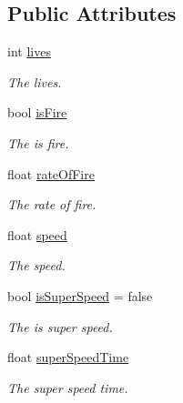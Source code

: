 \subsection*{Public Attributes}
\begin{DoxyCompactItemize}
\item 
int \mbox{\hyperlink{class_player_attributes_aa666ed9677fdae99cca2a98ab6796ea7}{lives}}
\begin{DoxyCompactList}\small\item\em The lives. \end{DoxyCompactList}\item 
bool \mbox{\hyperlink{class_player_attributes_a4bb2a3a44344d0e8e05ffd3c02b5e66c}{is\+Fire}}
\begin{DoxyCompactList}\small\item\em The is fire. \end{DoxyCompactList}\item 
float \mbox{\hyperlink{class_player_attributes_a8635c9f8b5b38f06899752f7df80a65b}{rate\+Of\+Fire}}
\begin{DoxyCompactList}\small\item\em The rate of fire. \end{DoxyCompactList}\item 
float \mbox{\hyperlink{class_player_attributes_a3c05ed20ca014ddef39d9e361bf9afe9}{speed}}
\begin{DoxyCompactList}\small\item\em The speed. \end{DoxyCompactList}\item 
bool \mbox{\hyperlink{class_player_attributes_a0b731fb2d368a90acfeaf37692bd1e33}{is\+Super\+Speed}} = false
\begin{DoxyCompactList}\small\item\em The is super speed. \end{DoxyCompactList}\item 
float \mbox{\hyperlink{class_player_attributes_a8d65a1b221e07cde721025345011066f}{super\+Speed\+Time}}
\begin{DoxyCompactList}\small\item\em The super speed time. \end{DoxyCompactList}\end{DoxyCompactItemize}
